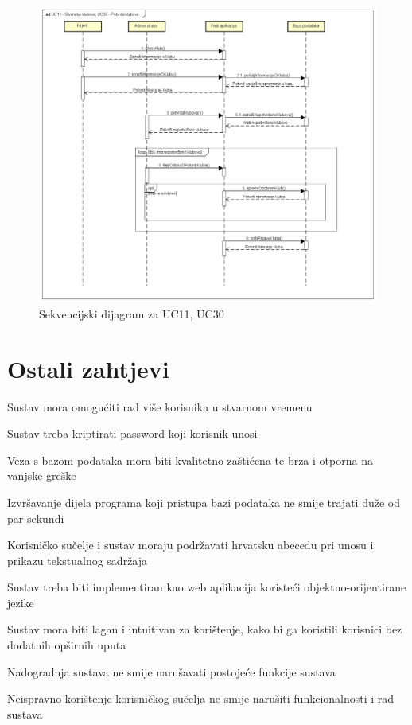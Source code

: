 				\begin{figure}[H]
					\centering
					\includegraphics[width=\textwidth]{slike/seq_dijagram4.png}
					\caption{Sekvencijski dijagram za UC11, UC30}
					\label{fig:my_label}
				\end{figure}
	
		\section{Ostali zahtjevi}
		
		
			 \begin{packed_item}
			 	\item {Sustav mora omogućiti rad više korisnika u stvarnom vremenu}
			 	\item {Sustav treba kriptirati password koji korisnik unosi}
			 	\item {Veza s bazom podataka mora biti kvalitetno zaštićena te brza i otporna na vanjske greške}
			 	\item {Izvršavanje dijela programa koji pristupa bazi podataka ne smije trajati duže od par sekundi}
			 	\item {Korisničko sučelje i sustav moraju podržavati hrvatsku abecedu pri unosu i prikazu tekstualnog sadržaja}
			 	\item {Sustav treba biti implementiran kao web aplikacija koristeći objektno-orijentirane jezike}
			 	\item {Sustav mora biti lagan i intuitivan za korištenje, kako bi ga koristili korisnici bez dodatnih opširnih uputa}
			 	\item {Nadogradnja sustava ne smije narušavati postojeće funkcije sustava}
			 	\item {Neispravno korištenje korisničkog sučelja ne smije narušiti funkcionalnosti i rad sustava}
			 \end{packed_item}
			 
	